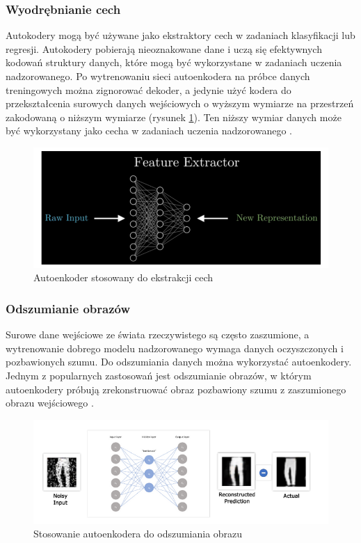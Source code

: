 \documentclass[12pt]{mwbk}
\theoremstyle{plain}
\theoremstyle{definition}
\theoremstyle{remark}
\newcommand\zrodlo[1]{\par\vspace{-3mm}{\small\textit{Źródło: }#1 }}
\begin{document}
\subsubsection{Wyodrębnianie cech}

Autokodery mogą być używane jako ekstraktory cech w zadaniach klasyfikacji lub regresji. Autokodery pobierają nieoznakowane dane i uczą się efektywnych kodowań struktury danych, które mogą być wykorzystane w zadaniach uczenia nadzorowanego. Po wytrenowaniu sieci autoenkodera na próbce danych treningowych można zignorować dekoder, a jedynie użyć kodera do przekształcenia surowych danych wejściowych o wyższym wymiarze na przestrzeń zakodowaną o niższym wymiarze (rysunek \ref{fig:feature-extractor}). Ten niższy wymiar danych może być wykorzystany jako cecha w zadaniach uczenia nadzorowanego \cite{kumar}.

\begin{figure}[!h]
	\centering
	\includegraphics[width=0.8\linewidth]{rys/feature_extractor.png}
	\caption{Autoenkoder stosowany do ekstrakcji cech}
	\zrodlo{\cite{kumar}}
	\label{fig:feature-extractor}
\end{figure}

\newpage

\subsubsection{Odszumianie obrazów}

Surowe dane wejściowe ze świata rzeczywistego są często zaszumione, a wytrenowanie dobrego modelu nadzorowanego wymaga danych oczyszczonych i pozbawionych szumu. Do odszumiania danych można wykorzystać autoenkodery. Jednym z popularnych zastosowań jest odszumianie obrazów, w którym autoenkodery próbują zrekonstruować obraz pozbawiony szumu z zaszumionego obrazu wejściowego \cite{kumar}.



\begin{figure}[!h]
	\centering
	\includegraphics[width=\linewidth]{rys/image_denoising.png}
	\caption{Stosowanie autoenkodera do odszumiania obrazu}
	\zrodlo{\cite{kumar}}
	\label{fig:image-denoising}
\end{figure}
\end{document}

